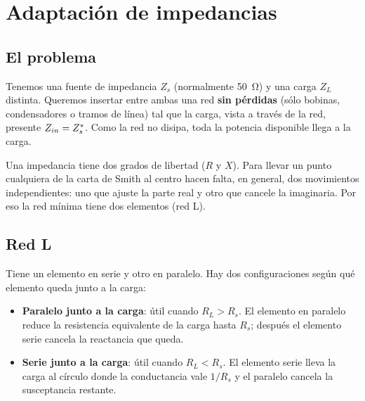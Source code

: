 \chapter{Adaptación de impedancias}\label{cap:adaptacion}

\section{El problema}

Tenemos una fuente de impedancia $Z_s$ (normalmente \SI{50}{\ohm}) y una carga $Z_L$ distinta. Queremos insertar entre ambas una red
\textbf{sin pérdidas} (sólo bobinas, condensadores o tramos de línea) tal que la carga, vista a través de la red, presente
$Z_{in} = Z_s^{*}$. Como la red no disipa, toda la potencia disponible llega a la carga.

\begin{intuicion}
Una impedancia tiene dos grados de libertad ($R$ y $X$). Para llevar un punto cualquiera de la carta de Smith al centro hacen falta, en general,
dos movimientos independientes: uno que ajuste la parte real y otro que cancele la imaginaria. Por eso la red mínima tiene dos elementos (red L).
\end{intuicion}

\section{Red L}

Tiene un elemento en serie y otro en paralelo. Hay dos configuraciones según qué elemento queda junto a la carga:
\begin{itemize}
\item \textbf{Paralelo junto a la carga}: útil cuando $R_L > R_s$. El elemento en paralelo reduce la resistencia equivalente de la carga
hasta $R_s$; después el elemento serie cancela la reactancia que queda.
\item \textbf{Serie junto a la carga}: útil cuando $R_L < R_s$. El elemento serie lleva la carga al círculo donde la conductancia vale $1/R_s$
y el paralelo cancela la susceptancia restante.
\end{itemize}


